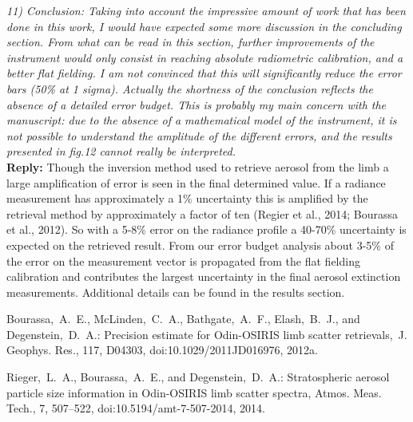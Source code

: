 \documentclass[12pt, notitlepage]{article}
\begin{document}
\textit{11) Conclusion: Taking into account the impressive amount of work that has been done
in this work, I would have expected some more discussion in the concluding section.
From what can be read in this section, further improvements of the instrument would
only consist in reaching absolute radiometric calibration, and a better flat fielding. I am
not convinced that this will significantly reduce the error bars (50\% at 1 sigma). Actually
the shortness of the conclusion reflects the absence of a detailed error budget. This is
probably my main concern with the manuscript: due to the absence of a mathematical
model of the instrument, it is not possible to understand the amplitude of the different
errors, and the results presented in fig.12 cannot really be interpreted.}\\

\textbf{Reply:} Though the inversion method used to retrieve aerosol from the limb a large amplification of error is seen in the final determined value. If a radiance measurement has approximately a 1\% uncertainty this is amplified by the retrieval method by approximately a factor of ten (Regier et al., 2014; Bourassa et al., 2012). So with a 5-8\% error on the radiance profile a 40-70\% uncertainty is expected on the retrieved result. From our error budget analysis about 3-5\% of the error on the measurement vector is propagated from the flat fielding calibration and contributes the largest uncertainty in the final aerosol extinction measurements. Additional details can be found in the results section.

\hrulefill

Bourassa,~A.~E., McLinden,~C.~A., Bathgate,~A.~F., Elash,~B.~J., and
Degenstein,~D.~A.: Precision estimate for Odin-OSIRIS limb scatter
retrievals,~J. Geophys. Res., 117, D04303,
doi:10.1029/2011JD016976,
2012a.

Rieger,~L.~A., Bourassa,~A.~E., and Degenstein,~D.~A.: Stratospheric aerosol
particle size information in Odin-OSIRIS limb scatter spectra, Atmos. Meas.
Tech., 7, 507--522,
doi:10.5194/amt-7-507-2014,
2014.
\end{document}
